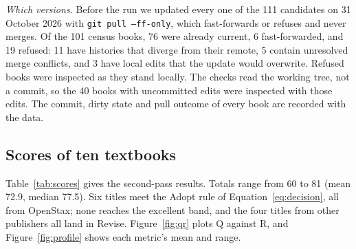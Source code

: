 \emph{Which versions.} Before the run we updated every one of the 111 candidates on 31 October 2026 with \texttt{git pull --ff-only}, which fast-forwards or refuses and never merges. Of the 101 census books, 76 were already current, 6 fast-forwarded, and 19 refused: 11 have histories that diverge from their remote, 5 contain unresolved merge conflicts, and 3 have local edits that the update would overwrite. Refused books were inspected as they stand locally. The checks read the working tree, not a commit, so the 40 books with uncommitted edits were inspected with those edits. The commit, dirty state and pull outcome of every book are recorded with the data.

\subsection{Scores of ten textbooks}
Table~\ref{tab:scores} gives the second-pass results. Totals range from 60 to 81 (mean 72.9, median 77.5). Six titles meet the Adopt rule of Equation~\ref{eq:decision}, all from OpenStax; none reaches the excellent band, and the four titles from other publishers all land in Revise. Figure~\ref{fig:qr} plots Q against R, and Figure~\ref{fig:profile} shows each metric's mean and range.

